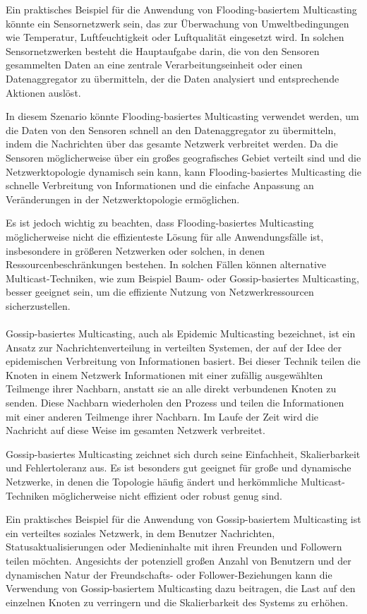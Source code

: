 Ein praktisches Beispiel für die Anwendung von Flooding-basiertem Multicasting könnte ein Sensornetzwerk sein, das zur Überwachung von Umweltbedingungen wie Temperatur, Luftfeuchtigkeit oder Luftqualität eingesetzt wird. In solchen Sensornetzwerken besteht die Hauptaufgabe darin, die von den Sensoren gesammelten Daten an eine zentrale Verarbeitungseinheit oder einen Datenaggregator zu übermitteln, der die Daten analysiert und entsprechende Aktionen auslöst.

In diesem Szenario könnte Flooding-basiertes Multicasting verwendet werden, um die Daten von den Sensoren schnell an den Datenaggregator zu übermitteln, indem die Nachrichten über das gesamte Netzwerk verbreitet werden. Da die Sensoren möglicherweise über ein großes geografisches Gebiet verteilt sind und die Netzwerktopologie dynamisch sein kann, kann Flooding-basiertes Multicasting die schnelle Verbreitung von Informationen und die einfache Anpassung an Veränderungen in der Netzwerktopologie ermöglichen.

Es ist jedoch wichtig zu beachten, dass Flooding-basiertes Multicasting möglicherweise nicht die effizienteste Lösung für alle Anwendungsfälle ist, insbesondere in größeren Netzwerken oder solchen, in denen Ressourcenbeschränkungen bestehen. In solchen Fällen können alternative Multicast-Techniken, wie zum Beispiel Baum- oder Gossip-basiertes Multicasting, besser geeignet sein, um die effiziente Nutzung von Netzwerkressourcen sicherzustellen.
\\\\
Gossip-basiertes Multicasting, auch als Epidemic Multicasting bezeichnet, ist ein Ansatz zur Nachrichtenverteilung in verteilten Systemen, der auf der Idee der epidemischen Verbreitung von Informationen basiert. Bei dieser Technik teilen die Knoten in einem Netzwerk Informationen mit einer zufällig ausgewählten Teilmenge ihrer Nachbarn, anstatt sie an alle direkt verbundenen Knoten zu senden. Diese Nachbarn wiederholen den Prozess und teilen die Informationen mit einer anderen Teilmenge ihrer Nachbarn. Im Laufe der Zeit wird die Nachricht auf diese Weise im gesamten Netzwerk verbreitet.

Gossip-basiertes Multicasting zeichnet sich durch seine Einfachheit, Skalierbarkeit und Fehlertoleranz aus. Es ist besonders gut geeignet für große und dynamische Netzwerke, in denen die Topologie häufig ändert und herkömmliche Multicast-Techniken möglicherweise nicht effizient oder robust genug sind.

Ein praktisches Beispiel für die Anwendung von Gossip-basiertem Multicasting ist ein verteiltes soziales Netzwerk, in dem Benutzer Nachrichten, Statusaktualisierungen oder Medieninhalte mit ihren Freunden und Followern teilen möchten. Angesichts der potenziell großen Anzahl von Benutzern und der dynamischen Natur der Freundschafts- oder Follower-Beziehungen kann die Verwendung von Gossip-basiertem Multicasting dazu beitragen, die Last auf den einzelnen Knoten zu verringern und die Skalierbarkeit des Systems zu erhöhen.

